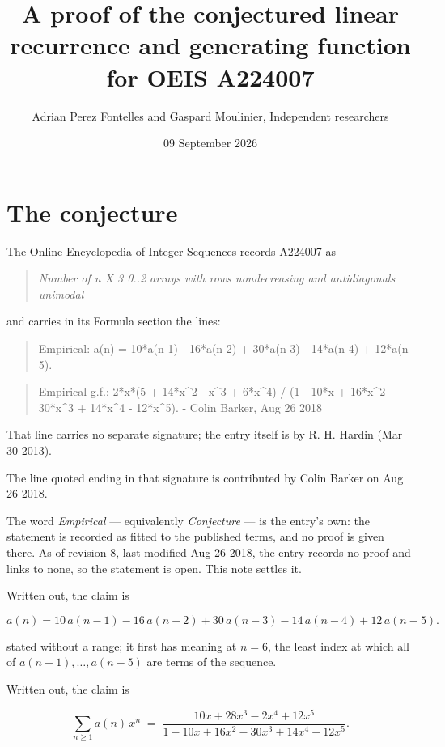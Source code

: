 \documentclass[11pt]{article}
\title{A proof of the conjectured linear recurrence and generating function for OEIS A224007}
\author{Adrian Perez Fontelles and Gaspard Moulinier, Independent researchers}
\date{09 September 2026}
\theoremstyle{definition}
\begin{document}
\maketitle
\section{The conjecture}

The Online Encyclopedia of Integer Sequences records \href{https://oeis.org/A224007}{A224007} as

\begin{quote}\itshape Number of n X 3 0..2 arrays with rows nondecreasing and antidiagonals unimodal\end{quote}

and carries in its Formula section the lines:

\begin{quote}\ttfamily Empirical: a(n) = 10*a(n-1) - 16*a(n-2) + 30*a(n-3) - 14*a(n-4) + 12*a(n-5).\end{quote}

\begin{quote}\ttfamily Empirical g.f.: 2*x*(5 + 14*x\textasciicircum{}2 - x\textasciicircum{}3 + 6*x\textasciicircum{}4) / (1 - 10*x + 16*x\textasciicircum{}2 - 30*x\textasciicircum{}3 + 14*x\textasciicircum{}4 - 12*x\textasciicircum{}5). - Colin Barker, Aug 26 2018\end{quote}

That line carries no separate signature; the entry itself is by R. H. Hardin (Mar 30 2013).

The line quoted ending in that signature is contributed by Colin Barker on Aug 26 2018.

The word {\itshape Empirical} --- equivalently {\itshape Conjecture} --- is the entry's own: the statement is recorded as fitted to the published terms, and no proof is given there. As of revision 8, last modified Aug 26 2018, the entry records no proof and links to none, so the statement is open. This note settles it.

Written out, the claim is

\[a(n) = 10\,a(n-1) - 16\,a(n-2) + 30\,a(n-3) - 14\,a(n-4) + 12\,a(n-5).\]

stated without a range; it first has meaning at $n = 6$, the least index at which all of $a(n-1),\dots,a(n-5)$ are terms of the sequence.

Written out, the claim is

\[\sum_{n \ge 1} a(n)\,x^n \;=\; \frac{10x + 28x^{3} - 2x^{4} + 12x^{5}}{1 - 10x + 16x^{2} - 30x^{3} + 14x^{4} - 12x^{5}}.\]
\end{document}

